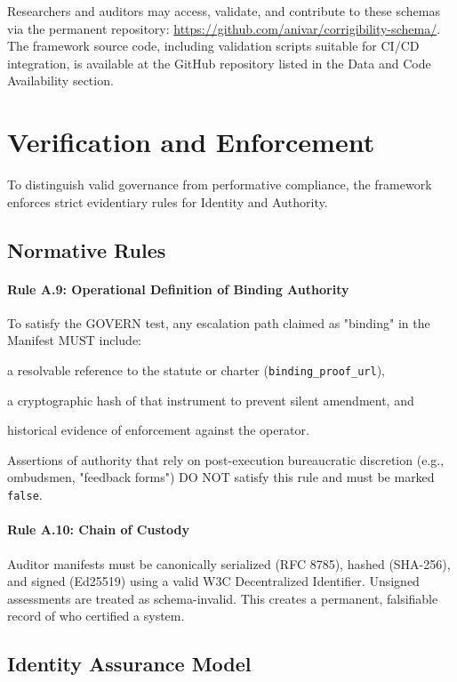 \documentclass{article}
\begin{document}
Researchers and auditors may access, validate, and contribute to these schemas via the permanent repository: \url{https://github.com/anivar/corrigibility-schema/}. The framework source code, including validation scripts suitable for CI/CD integration, is available at the GitHub repository listed in the Data and Code Availability section.

\section{Verification and Enforcement}
\label{appendix:rules}

To distinguish valid governance from performative compliance, the framework enforces strict evidentiary rules for Identity and Authority.

\subsection{Normative Rules}

\paragraph{Rule A.9: Operational Definition of Binding Authority}
To satisfy the GOVERN test, any escalation path claimed as "binding" in the Manifest MUST include:
\begin{enumerate*}[label=(\roman*)]
    \item a resolvable reference to the statute or charter (\texttt{binding\_proof\_url}),
    \item a cryptographic hash of that instrument to prevent silent amendment, and
    \item historical evidence of enforcement against the operator.
\end{enumerate*}
Assertions of authority that rely on post-execution bureaucratic discretion (e.g., ombudsmen, "feedback forms") DO NOT satisfy this rule and must be marked \texttt{false}.

\paragraph{Rule A.10: Chain of Custody}
Auditor manifests must be canonically serialized (RFC 8785), hashed (SHA-256), and signed (Ed25519) using a valid W3C Decentralized Identifier. Unsigned assessments are treated as schema-invalid. This creates a permanent, falsifiable record of who certified a system.

\subsection{Identity Assurance Model}
\end{document}

